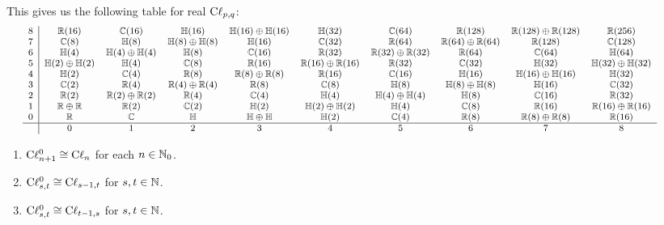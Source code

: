 \M
This gives us the following table for real $\mathrm{C}\ell_{p,q}$:
\begin{equation*}
  \begin{footnotesize}\hskip-3em
\begin{array}{c|ccccccccc}
  8 & \RR(16)            & \CC(16) & \HH(16) & \HH(16)\oplus\HH(16) & \HH(32) & \CC(64) & \RR(128) & \RR(128)\oplus\RR(128) & \RR(256)\\
  7 & \CC(8)             & \HH(8) & \HH(8)\oplus\HH(8) & \HH(16) & \CC(32) & \RR(64) & \RR(64)\oplus\RR(64) & \RR(128) & \CC(128)\\
  6 & \HH(4)             & \HH(4)\oplus\HH(4) & \HH(8) & \CC(16) & \RR(32) & \RR(32)\oplus\RR(32) & \RR(64) & \CC(64) & \HH(64)\\
  5 & \HH(2)\oplus\HH(2) & \HH(4) & \CC(8) & \RR(16) & \RR(16)\oplus\RR(16) & \RR(32) & \CC(32) & \HH(32) & \HH(32)\oplus\HH(32)\\
  4 & \HH(2)             & \CC(4) & \RR(8) & \RR(8)\oplus\RR(8) & \RR(16) & \CC(16) & \HH(16) & \HH(16)\oplus\HH(16)  & \HH(32)\\
  3 & \CC(2)             & \RR(4) & \RR(4)\oplus\RR(4) & \RR(8) & \CC(8) & \HH(8) & \HH(8)\oplus\HH(8) & \HH(16) & \CC(32)\\
  2 & \RR(2)             & \RR(2)\oplus\RR(2) & \RR(4) & \CC(4) & \HH(4) & \HH(4)\oplus\HH(4) & \HH(8) & \CC(16) & \RR(32)\\
  1 & \RR\oplus\RR       & \RR(2) & \CC(2) & \HH(2) & \HH(2)\oplus\HH(2) & \HH(4) & \CC(8) & \RR(16)  & \RR(16)\oplus\RR(16) \\
  0 & \RR                & \CC    & \HH & \HH\oplus\HH & \HH(2) & \CC(4) & \RR(8) & \RR(8)\oplus\RR(8) & \RR(16) \\\hline
    & 0                  & 1  & 2 & 3 & 4 & 5 & 6 & 7 & 8
\end{array}
  \end{footnotesize}
\end{equation*}

\begin{theorem}
  \begin{enumerate}
  \item $\mathrm{C}\ell_{n+1}^{0}\cong\mathrm{C}\ell_{n}$ for each $n\in\mathbb{N}_{0}$.
  \item $\mathrm{C}\ell_{s,t}^{0}\cong\mathrm{C}\ell_{s-1,t}$ for $s, t\in\mathbb{N}$.
  \item $\mathrm{C}\ell_{s,t}^{0}\cong\mathrm{C}\ell_{t-1,s}$ for $s, t\in\mathbb{N}$.
  \end{enumerate}
\end{theorem}

